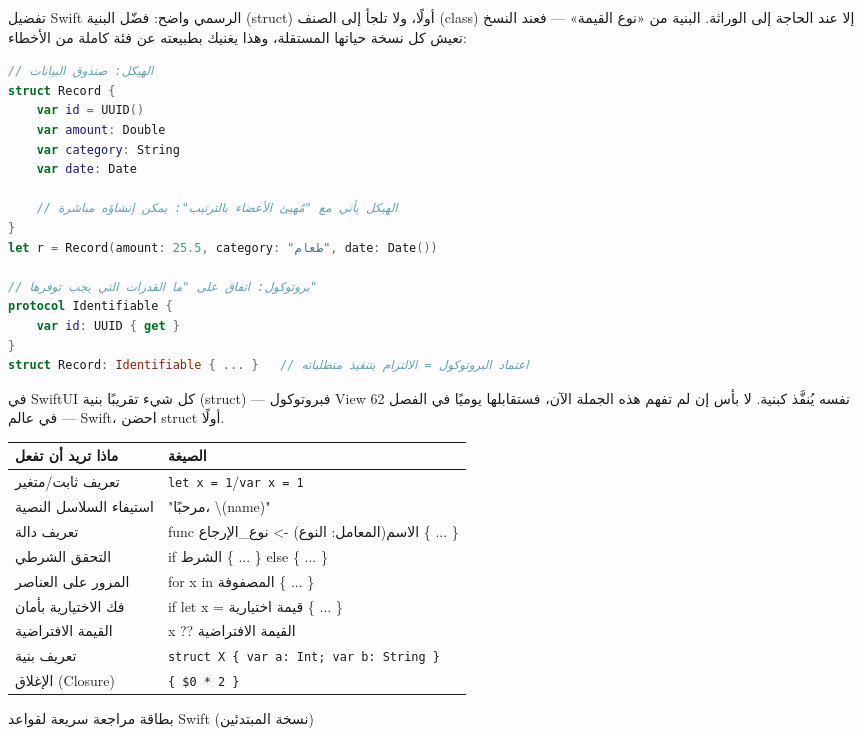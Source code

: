 
تفضيل Swift الرسمي واضح: فضّل البنية (struct) أولًا، ولا تلجأ إلى الصنف (class) إلا عند الحاجة إلى الوراثة. البنية من «نوع القيمة» — فعند النسخ تعيش كل نسخة حياتها المستقلة، وهذا يغنيك بطبيعته عن فئة كاملة من الأخطاء:

\begin{lstlisting}[language=Swift]
// الهيكل: صندوق البيانات
struct Record {
    var id = UUID()
    var amount: Double
    var category: String
    var date: Date

    // الهيكل يأتي مع "مُهيئ الأعضاء بالترتيب": يمكن إنشاؤه مباشرة
}
let r = Record(amount: 25.5, category: "طعام", date: Date())

// بروتوكول: اتفاق على "ما القدرات التي يجب توفرها"
protocol Identifiable {
    var id: UUID { get }
}
struct Record: Identifiable { ... }   // اعتماد البروتوكول = الالتزام بتنفيذ متطلباته
\end{lstlisting}

في SwiftUI كل شيء تقريبًا بنية (struct) — فبروتوكول View نفسه يُنفَّذ كبنية. لا بأس إن لم تفهم هذه الجملة الآن، فستقابلها يوميًا في الفصل 62 — في عالم Swift، احضن struct أولًا.


\begin{center}
\begin{tabularx}{\linewidth}{|X|X|}
\hline
\textbf{ماذا تريد أن تفعل} & \textbf{الصيغة} \tabularnewline
\hline
تعريف ثابت/متغير & \texttt{let x = 1}/\texttt{var x = 1} \tabularnewline
استيفاء السلاسل النصية & "مرحبًا، \textbackslash{}(name)" \tabularnewline
تعريف دالة & func الاسم(المعامل: النوع) -> نوع\_الإرجاع \{ ... \} \tabularnewline
التحقق الشرطي & if الشرط \{ ... \} else \{ ... \} \tabularnewline
المرور على العناصر & for x in المصفوفة \{ ... \} \tabularnewline
فك الاختيارية بأمان & if let x = قيمة اختيارية \{ ... \} \tabularnewline
القيمة الافتراضية & x ?? القيمة الافتراضية \tabularnewline
تعريف بنية & \texttt{struct X \{ var a: Int; var b: String \}} \tabularnewline
الإغلاق (Closure) & \texttt{\{ \$0 * 2 \}} \tabularnewline
\hline
\end{tabularx}
\end{center}

\begin{center}\small\color{gray}بطاقة مراجعة سريعة لقواعد Swift (نسخة المبتدئين)\end{center}

